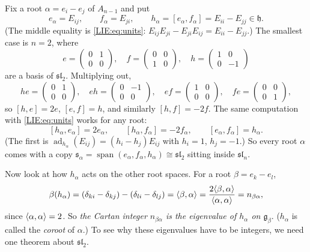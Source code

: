 Fix a root $\alpha=e_i-e_j$ of $A_{n-1}$ and put
\[
  e_\alpha=E_{ij},\qquad f_\alpha=E_{ji},\qquad h_\alpha=[e_\alpha,f_\alpha]=E_{ii}-E_{jj}\in\mathfrak h.
\]
(The middle equality is \eqref{LIE:eq:units}: $E_{ij}E_{ji}-E_{ji}E_{ij}=E_{ii}-E_{jj}$.) The smallest
case is $n=2$, where
\[
  e=\begin{pmatrix}0&1\\0&0\end{pmatrix},\quad
  f=\begin{pmatrix}0&0\\1&0\end{pmatrix},\quad
  h=\begin{pmatrix}1&0\\0&-1\end{pmatrix}
\]
are a basis of $\mathfrak{sl}_2$. Multiplying out,
\[
  he=\begin{pmatrix}0&1\\0&0\end{pmatrix},\quad eh=\begin{pmatrix}0&-1\\0&0\end{pmatrix},\quad
  ef=\begin{pmatrix}1&0\\0&0\end{pmatrix},\quad fe=\begin{pmatrix}0&0\\0&1\end{pmatrix},
\]
so $[h,e]=2e$, $[e,f]=h$, and similarly $[h,f]=-2f$. The same computation with
\eqref{LIE:eq:units} works for any root:
\begin{equation}\label{LIE:eq:sl2rel}
  [h_\alpha,e_\alpha]=2e_\alpha,\qquad [h_\alpha,f_\alpha]=-2f_\alpha,\qquad [e_\alpha,f_\alpha]=h_\alpha .
\end{equation}
(The first is $\operatorname{ad}_{h_\alpha}(E_{ij})=(h_i-h_j)E_{ij}$ with $h_i=1$, $h_j=-1$.) So every root $\alpha$ comes with a copy
$\mathfrak s_\alpha=\operatorname{span}(e_\alpha,f_\alpha,h_\alpha)\cong\mathfrak{sl}_2$ sitting inside $\mathfrak{sl}_n$.

Now look at how $h_\alpha$ acts on the other root spaces. For a root $\beta=e_k-e_l$,
\[
  \beta(h_\alpha)=(\delta_{ki}-\delta_{kj})-(\delta_{li}-\delta_{lj})=\langle \beta, \alpha\rangle
  =\frac{2\langle \beta, \alpha\rangle}{\langle \alpha, \alpha\rangle}=n_{\beta\alpha},
\]
since $\langle \alpha, \alpha\rangle=2$. So \emph{the Cartan integer $n_{\beta\alpha}$ is the eigenvalue of
$h_\alpha$ on $\mathfrak g_\beta$}. ($h_\alpha$ is called the \emph{coroot} of $\alpha$.) To see why these
eigenvalues have to be integers, we need one theorem about $\mathfrak{sl}_2$.

